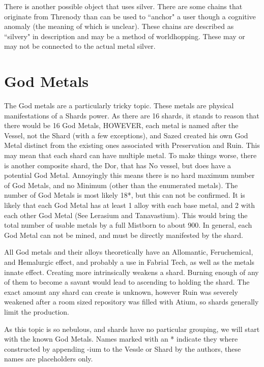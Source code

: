 \documentclass[conference]{IEEEtran}
\begin{document}
There is another possible object that uses silver.  There are some chains that originate from Threnody than can be used to ``anchor" a user though a cognitive anomaly (the meaning of which is unclear).  These chains are described as ``silvery" in description and may be a method of worldhopping.  These may or may not be connected to the actual metal silver.

\section*{God Metals}
The God metals are a particularly tricky topic.  These metals are physical manifestations of a Shards power.  As there are 16 shards, it stands to reason that there would be 16 God Metals, HOWEVER, each metal is named after the Vessel, not the Shard (with a few exceptions), and Sazed created his own God Metal distinct from the existing ones associated with Preservation and Ruin.  This may mean that each shard can have multiple metal.  To make things worse, there is another composite shard, the Dor, that has No vessel, but does have a potential God Metal.  Annoyingly this means there is no hard maximum number of God Metals, and no Minimum (other than the enumerated metals).  The number of God Metals is most likely 18*, but this can not be confirmed.  It is likely that each God Metal has at least 1 alloy with each base metal, and 2 with each other God Metal (See Lerasium and Tanavastium).  This would bring the total number of usable metals by a full Mistborn to about 900.  In general, each God Metal can not be mined, and must be directly manifested by the shard.

All God metals and their alloys theoretically have an Allomantic, Feruchemical, and Hemalurgic effect, and probably a use in Fabrial Tech, as well as the metals innate effect.  Creating more intrinsically weakens a shard.  Burning enough of any of them to become a savant would lead to ascending to holding the shard.  
The exact amount any shard can create is unknown, however Ruin was severely weakened after a room sized repository was filled with Atium, so shards generally limit the production.

As this topic is so nebulous, and shards have no particular grouping, we will start with the known God Metals.  Names marked with an * indicate they where constructed by appending -ium to the Vessle or Shard by the authors, these names are placeholders only.  
\end{document}
